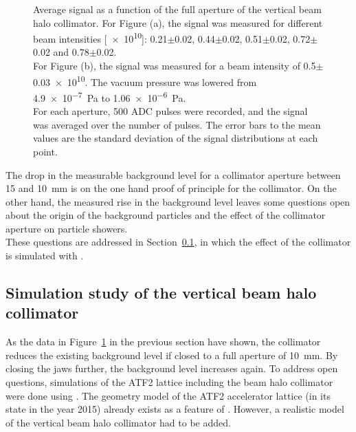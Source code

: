 \begin{figure}
\caption[RHUL Cherenkov detector signal vs. collimator aperture]{
Average signal as a function of the full aperture of the vertical beam halo collimator. 
For Figure (a), the signal was measured for different beam intensities [\num[detect-all]{e10}]: 0.21$\pm$0.02, 0.44$\pm$0.02, 0.51$\pm$0.02, 0.72$\pm$0.02 and 0.78$\pm$0.02. 
\\For Figure (b), the signal was measured for a beam intensity of \num[detect-all]{0.5}$\pm$\num[detect-all]{0.03e10}. 
The vacuum pressure was lowered from \SI[detect-all]{4.9e-7}{\pascal} to \SI[detect-all]{1.06e-6}{\pascal}. 
\\For each aperture, 500 ADC pulses were recorded, and the signal was averaged over the number of pulses. 
The error bars to the mean values are the standard deviation of the signal distributions at each point.}
\label{fig:AverageSignal_Aperture_Symmetric}
\end{figure}

The drop in the measurable background level for a collimator aperture between 15 and \SI{10}{\milli\metre} is on the one hand proof of principle for the collimator.
On the other hand, the measured rise in the background level leaves some questions open about the origin of the background particles and the effect of the collimator aperture on particle showers.
\\These questions are addressed in Section~\ref{sec:BDSIM_sim}, in which the effect of the collimator is simulated with \bdsim.

\subsection{Simulation study of the vertical beam halo collimator}
\label{sec:BDSIM_sim}
As the data in Figure~\ref{fig:AverageSignal_Aperture_Symmetric} in the previous section have shown, the collimator reduces the existing background level if closed to a full aperture of \SI{10}{\milli\metre}. 
By closing the jaws further, the background level increases again.
To address open questions, simulations of the ATF2 lattice including the beam halo collimator were done using \bdsim.
The geometry model of the ATF2 accelerator lattice (in its state in the year 2015) already exists as a feature of \bdsim.
However, a realistic model of the vertical beam halo collimator had to be added.

